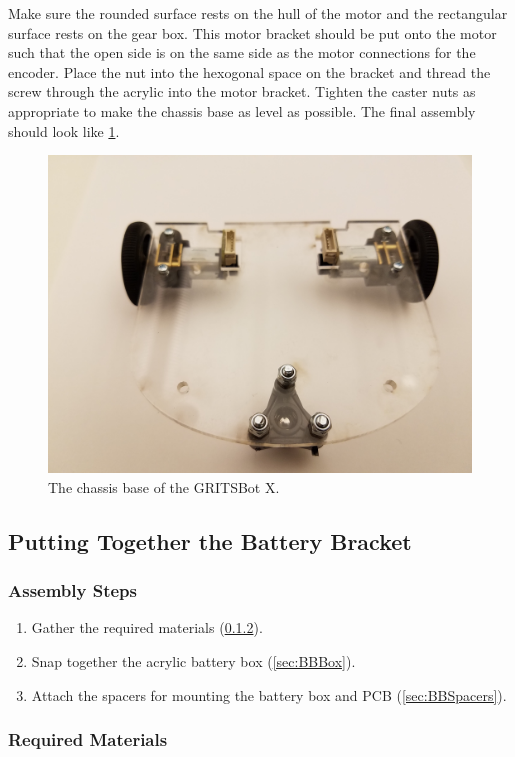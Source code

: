 Make sure the rounded surface rests on the hull of the motor and the rectangular surface rests on the gear box. This motor bracket should be put onto the motor such that the open side is on the same side as the motor connections for the encoder. Place the nut into the hexogonal space on the bracket and thread the screw through the acrylic into the motor bracket. Tighten the caster nuts as appropriate to make the chassis base as level as possible. The final assembly should look like \cref{fig:finalBase}.

\begin{figure}[h!]
\centering
\includegraphics[width=0.65\columnwidth, keepaspectratio]{./figs/20181219_112632.jpg}
\caption{The chassis base of the GRITSBot X.}
\label{fig:finalBase}
\end{figure}

\subsection{Putting Together the Battery Bracket}
\label{sec:BB}

\subsubsection{Assembly Steps}
\label{sec:BBSteps}

\begin{enumerate}
\item Gather the required materials (\cref{sec:BBParts}).
\item Snap together the acrylic battery box (\cref{sec:BBBox}).
\item Attach the spacers for mounting the battery box and PCB (\cref{sec:BBSpacers}).
\end{enumerate}

\subsubsection{Required Materials}
\label{sec:BBParts}

